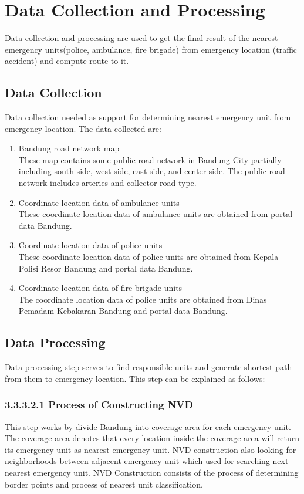 \section{Data Collection and Processing}
Data collection and processing are used to get the final result of the nearest emergency units(police, ambulance, fire brigade) from emergency location (traffic accident) and compute route to it.

\subsection{Data Collection}
Data collection needed as support for determining nearest emergency unit from emergency location. The data collected are:

\begin{enumerate}[label=- , leftmargin=*, topsep=5pt, itemsep=-1ex, partopsep=1ex, parsep=2ex]
\item Bandung road network map\\
These map contains some public road network in Bandung City partially including south side, west side, east side, and center side. The public road network includes arteries and collector road type.
\item Coordinate location data of ambulance units\\
These coordinate location data of ambulance units are obtained from portal data Bandung.
\item Coordinate location data of police units\\
These coordinate location data of police units are obtained from Kepala Polisi Resor Bandung and portal data Bandung.
\item Coordinate location data of fire brigade units\\
The coordinate location data of police units are obtained from Dinas Pemadam Kebakaran Bandung and portal data Bandung.
\end{enumerate}

\subsection{Data Processing}
Data processing step serves to find responsible units and generate shortest path from them to emergency location. This step can be explained as follows:

\subsubsection{3.3.3.2.1 Process of Constructing NVD}
This step works by divide Bandung into coverage area for each emergency unit. The coverage area denotes that every location inside the coverage area will return its emergency unit as nearest emergency unit. NVD construction also looking for neighborhoods between adjacent emergency unit which used for searching next nearest emergency unit. NVD Construction consists of the process of determining border points and process of nearest unit classification.

